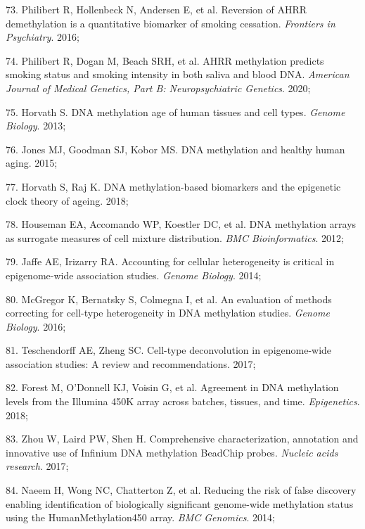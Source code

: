 \documentclass[11pt,oneside]{bristolthesis}
\newenvironment{cslreferences}%
  {}%
  {\par}
\begin{document}
\begin{cslreferences}
\leavevmode\hypertarget{ref-Philibert2016}{}%
73. Philibert R, Hollenbeck N, Andersen E, et al. Reversion of AHRR demethylation is a quantitative biomarker of smoking cessation. \emph{Frontiers in Psychiatry}. 2016;

\leavevmode\hypertarget{ref-Philibert2020}{}%
74. Philibert R, Dogan M, Beach SRH, et al. AHRR methylation predicts smoking status and smoking intensity in both saliva and blood DNA. \emph{American Journal of Medical Genetics, Part B: Neuropsychiatric Genetics}. 2020;

\leavevmode\hypertarget{ref-Horvath2013}{}%
75. Horvath S. DNA methylation age of human tissues and cell types. \emph{Genome Biology}. 2013;

\leavevmode\hypertarget{ref-Jones2015}{}%
76. Jones MJ, Goodman SJ, Kobor MS. DNA methylation and healthy human aging. 2015;

\leavevmode\hypertarget{ref-Horvath2018}{}%
77. Horvath S, Raj K. DNA methylation-based biomarkers and the epigenetic clock theory of ageing. 2018;

\leavevmode\hypertarget{ref-Houseman2012}{}%
78. Houseman EA, Accomando WP, Koestler DC, et al. DNA methylation arrays as surrogate measures of cell mixture distribution. \emph{BMC Bioinformatics}. 2012;

\leavevmode\hypertarget{ref-Jaffe2014}{}%
79. Jaffe AE, Irizarry RA. Accounting for cellular heterogeneity is critical in epigenome-wide association studies. \emph{Genome Biology}. 2014;

\leavevmode\hypertarget{ref-McGregor2016}{}%
80. McGregor K, Bernatsky S, Colmegna I, et al. An evaluation of methods correcting for cell-type heterogeneity in DNA methylation studies. \emph{Genome Biology}. 2016;

\leavevmode\hypertarget{ref-Teschendorff2017}{}%
81. Teschendorff AE, Zheng SC. Cell-type deconvolution in epigenome-wide association studies: A review and recommendations. 2017;

\leavevmode\hypertarget{ref-Forest2018}{}%
82. Forest M, O'Donnell KJ, Voisin G, et al. Agreement in DNA methylation levels from the Illumina 450K array across batches, tissues, and time. \emph{Epigenetics}. 2018;

\leavevmode\hypertarget{ref-Zhou2017}{}%
83. Zhou W, Laird PW, Shen H. Comprehensive characterization, annotation and innovative use of Infinium DNA methylation BeadChip probes. \emph{Nucleic acids research}. 2017;

\leavevmode\hypertarget{ref-Naeem2014}{}%
84. Naeem H, Wong NC, Chatterton Z, et al. Reducing the risk of false discovery enabling identification of biologically significant genome-wide methylation status using the HumanMethylation450 array. \emph{BMC Genomics}. 2014;


\end{cslreferences}
\end{document}

